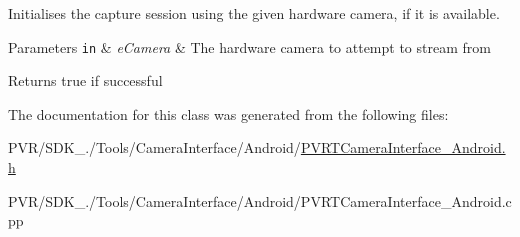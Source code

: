 Initialises the capture session using the given hardware camera, if it is available. 



 
\begin{DoxyParams}[1]{Parameters}
\mbox{\tt in}  & {\em e\+Camera} & The hardware camera to attempt to stream from \\
\hline
\end{DoxyParams}
\begin{DoxyReturn}{Returns}
true if successful 
\end{DoxyReturn}


The documentation for this class was generated from the following files\+:\begin{DoxyCompactItemize}
\item 
P\+V\+R/\+S\+D\+K\+\_./\+Tools/\+Camera\+Interface/\+Android/\hyperlink{_p_v_r_t_camera_interface___android_8h}{P\+V\+R\+T\+Camera\+Interface\+\_\+\+Android.\+h}\item 
P\+V\+R/\+S\+D\+K\+\_./\+Tools/\+Camera\+Interface/\+Android/P\+V\+R\+T\+Camera\+Interface\+\_\+\+Android.\+cpp\end{DoxyCompactItemize}
